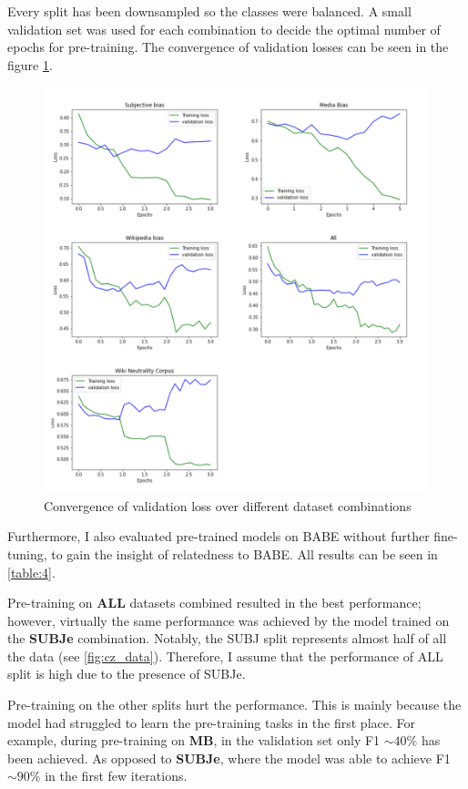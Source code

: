Every split has been downsampled so the classes were balanced. A small validation set was used for each combination to decide the optimal number of epochs for pre-training. The convergence of validation losses can be seen in the figure \ref{fig:all_losses}.
\begin{figure}
  \includegraphics[scale=0.5]{my_modules/multimedia/all_losses.png}
  \caption{Convergence of validation loss over different dataset combinations}
  \label{fig:all_losses}
\end{figure}

Furthermore, I also evaluated pre-trained models on BABE without further fine-tuning, to gain the insight of relatedness to BABE. All results can be seen in \ref{table:4}.



Pre-training on \textbf{ALL} datasets combined resulted in the best performance; however, virtually the same performance was achieved by the model trained on the \textbf{SUBJe} combination. Notably, the SUBJ split represents almost half of all the data (see \ref{fig:cz_data}). Therefore, I assume that the performance of ALL split is high due to the presence of SUBJe.

Pre-training on the other splits hurt the performance. This is mainly because the model had struggled to learn the pre-training tasks in the first place. For example, during pre-training on \textbf{MB}, in the validation set only F1 $\sim40\%$ has been achieved. As opposed to \textbf{SUBJe}, where the model was able to achieve F1 $\sim90\%$ in the first few iterations.


